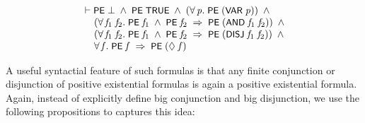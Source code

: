 \documentclass[letterpaper]{article}
\renewcommand{\HOLConst}[1]{{\textsf{\upshape\small #1}}}
\newenvironment{holmath}{\begin{displaymath}\begin{array}{l}}{\end{array}\end{displaymath}\ignorespacesafterend}
\begin{document}
\begin{holmath}
  \ensuremath{\HOLTokenTurnstile}\HOLConst{PE}\;\HOLSymConst{\ensuremath{\bot}}\;\HOLSymConst{\HOLTokenConj{}}\;\HOLConst{PE}\;\HOLConst{TRUE}\;\HOLSymConst{\HOLTokenConj{}}\;(\HOLSymConst{\HOLTokenForall{}}\HOLBoundVar{p}.\;\HOLConst{PE}\;(\HOLConst{VAR}\;\HOLBoundVar{p}))\;\HOLSymConst{\HOLTokenConj{}}\\
\;\;\;\;\;(\HOLSymConst{\HOLTokenForall{}}\HOLBoundVar{f\sb{\mathrm{1}}}\;\HOLBoundVar{f\sb{\mathrm{2}}}.\;\HOLConst{PE}\;\HOLBoundVar{f\sb{\mathrm{1}}}\;\HOLSymConst{\HOLTokenConj{}}\;\HOLConst{PE}\;\HOLBoundVar{f\sb{\mathrm{2}}}\;\HOLSymConst{\HOLTokenImp{}}\;\HOLConst{PE}\;(\HOLConst{AND}\;\HOLBoundVar{f\sb{\mathrm{1}}}\;\HOLBoundVar{f\sb{\mathrm{2}}}))\;\HOLSymConst{\HOLTokenConj{}}\\
\;\;\;\;\;(\HOLSymConst{\HOLTokenForall{}}\HOLBoundVar{f\sb{\mathrm{1}}}\;\HOLBoundVar{f\sb{\mathrm{2}}}.\;\HOLConst{PE}\;\HOLBoundVar{f\sb{\mathrm{1}}}\;\HOLSymConst{\HOLTokenConj{}}\;\HOLConst{PE}\;\HOLBoundVar{f\sb{\mathrm{2}}}\;\HOLSymConst{\HOLTokenImp{}}\;\HOLConst{PE}\;(\HOLConst{DISJ}\;\HOLBoundVar{f\sb{\mathrm{1}}}\;\HOLBoundVar{f\sb{\mathrm{2}}}))\;\HOLSymConst{\HOLTokenConj{}}\\
\;\;\;\;\;\HOLSymConst{\HOLTokenForall{}}\HOLBoundVar{f}.\;\HOLConst{PE}\;\HOLBoundVar{f}\;\HOLSymConst{\HOLTokenImp{}}\;\HOLConst{PE}\;(\HOLSymConst{\ensuremath{\Diamond}}\;\HOLBoundVar{f})
\end{holmath}

A useful syntactial feature of such formulas is that any finite conjunction or disjunction of positive existential formulas is again a positive existential formula. Again, instead of explicitly define big conjunction and big disjunction, we use the following propositions to captures this idea:
\end{document}
